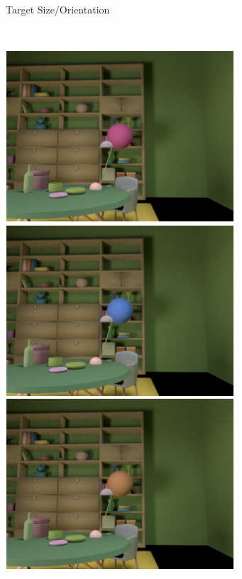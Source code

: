 \documentclass{jov}
\begin{document}
\begin{figure}
\begin{subfigure}[b]{0.18 \textwidth}
        \caption{Target Size/Orientation}
        \label{fig:targetSizeOrientation}
    \end{subfigure}
~
\centering
	\begin{subfigure}[b]{0.18 \textwidth}
    \centering
        \includegraphics[width=\textwidth]{../Figures/Figure5/Figure5_a.png}

\end{subfigure}
\end{figure}
\end{document}
